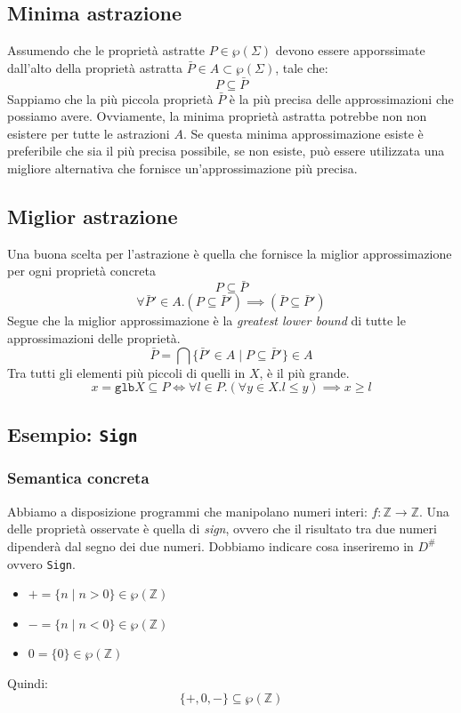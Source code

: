 \subsection{Minima astrazione}
Assumendo che le proprietà astratte $P \in \wp(\Sigma)$ devono essere apporssimate 
dall'alto della proprietà astratta $\bar{P} \in A \subset \wp(\Sigma)$, tale che:
\[
  P \subseteq \bar{P}
\]
Sappiamo che la più piccola proprietà $\bar{P}$ è la più precisa delle approssimazioni che possiamo avere.
Ovviamente, la minima proprietà astratta potrebbe non non esistere per tutte le astrazioni $A$.
Se questa minima approssimazione esiste è preferibile che sia il più precisa possibile, se non esiste,
può essere utilizzata una
migliore alternativa che fornisce un'approssimazione più precisa.
\subsection{Miglior astrazione}
Una buona scelta per l'astrazione è quella che fornisce la
miglior approssimazione per ogni proprietà concreta
\[
  P \subseteq \bar{P}
\]
\[
  \forall \bar{P}' \in A . (P \subseteq \bar{P}') \implies (\bar{P} \subseteq \bar{P}')
\]
Segue che la miglior approssimazione è la \textit{greatest lower bound} di tutte le approssimazioni
delle proprietà.
\[
\bar{P} = \bigcap \{\bar{P}' \in A \mid P \subseteq \bar{P}'\} \in A
\]
Tra tutti gli elementi più piccoli di quelli in $X$, è il più grande.
\[
  x = \texttt{glb}X \subseteq P \iff \forall l \in P . (\forall y \in X. l \leq y) \implies x \geq l
\]
\subsection{Esempio: \texttt{Sign}}
\subsubsection{Semantica concreta}
Abbiamo a disposizione programmi che manipolano numeri interi: \(f: \mathbb{Z} \to \mathbb{Z}\). Una delle 
proprietà osservate è quella di \textit{sign}, ovvero che il risultato tra due numeri dipenderà dal segno
dei due numeri. Dobbiamo indicare cosa inseriremo in $D^\#$ ovvero \texttt{Sign}.
\begin{itemize}
  \item $+ = \{n \mid n > 0\} \in \wp(\mathbb{Z})$
  \item $- = \{n \mid n < 0\} \in \wp(\mathbb{Z})$
  \item $0 = \{0\} \in \wp(\mathbb{Z})$
\end{itemize}
Quindi:
\[
  \{+, 0, -\} \subseteq \wp(\mathbb{Z})
\] 

